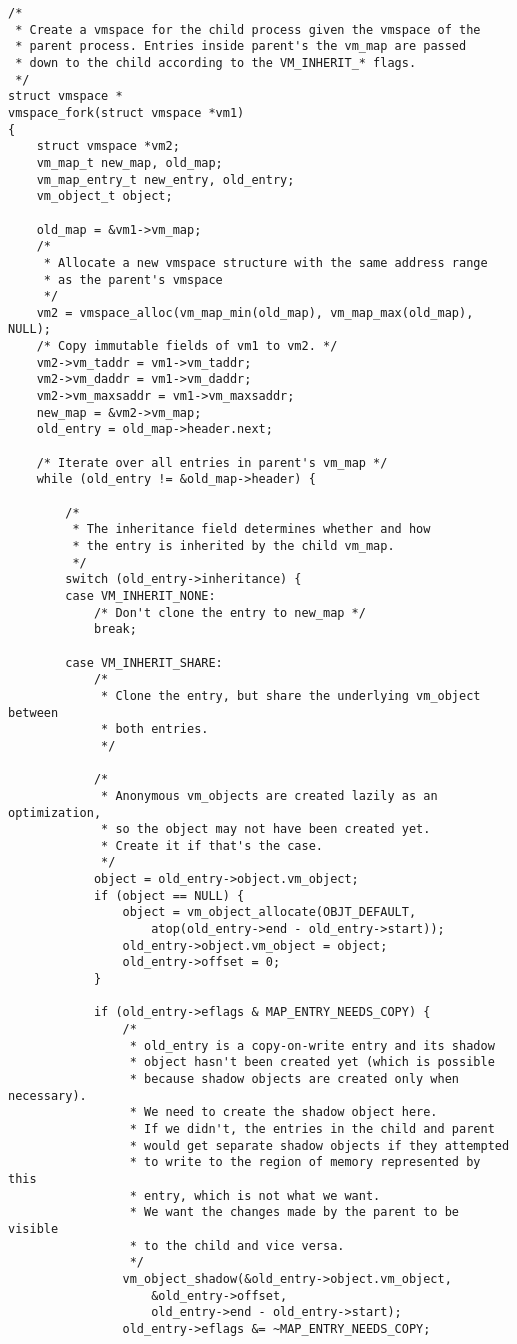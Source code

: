 \documentclass[shortabstract, english]{iithesis}
\newenvironment{code}{}{}
\begin{document}
\begin{code}
\begin{verbatim}
/*
 * Create a vmspace for the child process given the vmspace of the
 * parent process. Entries inside parent's the vm_map are passed
 * down to the child according to the VM_INHERIT_* flags.
 */
struct vmspace *
vmspace_fork(struct vmspace *vm1)
{
    struct vmspace *vm2;
    vm_map_t new_map, old_map;
    vm_map_entry_t new_entry, old_entry;
    vm_object_t object;

    old_map = &vm1->vm_map;
    /*
     * Allocate a new vmspace structure with the same address range
     * as the parent's vmspace
     */
    vm2 = vmspace_alloc(vm_map_min(old_map), vm_map_max(old_map), NULL);
    /* Copy immutable fields of vm1 to vm2. */
    vm2->vm_taddr = vm1->vm_taddr;
    vm2->vm_daddr = vm1->vm_daddr;
    vm2->vm_maxsaddr = vm1->vm_maxsaddr;
    new_map = &vm2->vm_map;
    old_entry = old_map->header.next;

    /* Iterate over all entries in parent's vm_map */
    while (old_entry != &old_map->header) {

        /*
         * The inheritance field determines whether and how
         * the entry is inherited by the child vm_map.
         */
        switch (old_entry->inheritance) {
        case VM_INHERIT_NONE:
            /* Don't clone the entry to new_map */
            break;

        case VM_INHERIT_SHARE:
            /*
             * Clone the entry, but share the underlying vm_object between
             * both entries.
             */

            /*
             * Anonymous vm_objects are created lazily as an optimization,
             * so the object may not have been created yet.
             * Create it if that's the case.
             */
            object = old_entry->object.vm_object;
            if (object == NULL) {
                object = vm_object_allocate(OBJT_DEFAULT,
                    atop(old_entry->end - old_entry->start));
                old_entry->object.vm_object = object;
                old_entry->offset = 0;
            }

            if (old_entry->eflags & MAP_ENTRY_NEEDS_COPY) {
                /*
                 * old_entry is a copy-on-write entry and its shadow
                 * object hasn't been created yet (which is possible
                 * because shadow objects are created only when necessary).
                 * We need to create the shadow object here.
                 * If we didn't, the entries in the child and parent
                 * would get separate shadow objects if they attempted
                 * to write to the region of memory represented by this
                 * entry, which is not what we want.
                 * We want the changes made by the parent to be visible
                 * to the child and vice versa.
                 */
                vm_object_shadow(&old_entry->object.vm_object,
                    &old_entry->offset,
                    old_entry->end - old_entry->start);
                old_entry->eflags &= ~MAP_ENTRY_NEEDS_COPY;


\end{verbatim}
\end{code}
\end{document}
